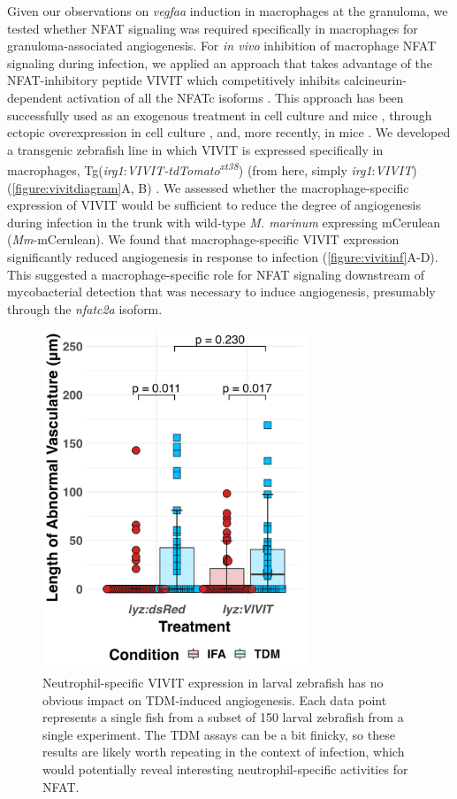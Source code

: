 Given our observations on \textit{vegfaa} induction in macrophages at the granuloma, we tested whether NFAT signaling was required specifically in macrophages for granuloma\hyp{}associated angiogenesis. For \textit{in vivo} inhibition of macrophage NFAT signaling during infection, we applied an approach that takes advantage of the NFAT\hyp{}inhibitory peptide VIVIT which competitively inhibits calcineurin\hyp{}dependent activation of all the NFATc isoforms \citep{Aramburu1999}. This approach has been successfully used as an exogenous treatment in cell culture \citep{Deerhake2021} and mice \citep{Noguchi2004, Elloumi2012, Rojanathammanee2015}, through ectopic overexpression in cell culture \citep{McCullagh2004},  and, more recently, in mice \citep{Poli2022, Peuker2022}. We developed a transgenic zebrafish line in which VIVIT is expressed specifically in macrophages, Tg(\textit{irg1}:\textit{VIVIT\hyp{}tdTomato\textsuperscript{xt38}}) (from here, simply \textit{irg1}:\textit{VIVIT}) (\autoref{figure:vivitdiagram}A, B) \citep{Sanderson2015}. We assessed whether the macrophage\hyp{}specific expression of VIVIT would be sufficient to reduce the degree of angiogenesis during infection in the trunk with wild\hyp{}type \textit{M. marinum} expressing mCerulean (\textit{Mm}\hyp{}mCerulean). We found that macrophage\hyp{}specific VIVIT expression significantly reduced angiogenesis in response to infection (\autoref{figure:vivitinf}A\hyp{}D). This suggested a macrophage\hyp{}specific role for NFAT signaling downstream of mycobacterial detection that was necessary to induce angiogenesis, presumably through the \textit{nfatc2a} isoform.

\begin{figure}
\centering
\includegraphics[height=4in]{images/JB210_lyzVIVIT_TDM_110522.png}
\caption{Neutrophil\hyp{}specific VIVIT expression in larval zebrafish has no obvious impact on TDM\hyp{}induced angiogenesis. Each data point represents a single fish from a subset of 150 larval zebrafish from a single experiment. The TDM assays can be a bit finicky, so these results are likely worth repeating in the context of infection, which would potentially reveal interesting neutrophil\hyp{}specific activities for NFAT.}
\label{figure:lyzvivit}
\end{figure}

